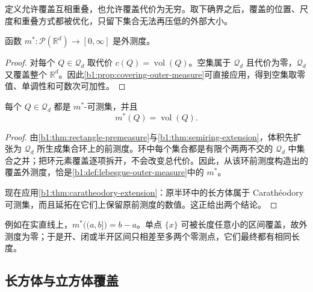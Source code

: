 定义允许覆盖互相重叠，也允许覆盖代价为无穷。取下确界之后，覆盖的位置、尺度和重叠方式都被优化，只留下集合无法再压低的外部大小。

\begin{proposition}
\label{b1:prop:lebesgue-outer-measure}
函数 \(m^*:\mathcal P(\mathbb R^d)\to[0,\infty]\) 是外测度。
\end{proposition}
\begin{proof}
对每个 \(Q\in\mathscr Q_d\) 取代价 \(c(Q)=\operatorname{vol}(Q)\)。空集属于 \(\mathscr Q_d\) 且代价为零，\(\mathscr Q_d\) 又覆盖整个 \(\mathbb R^d\)。因此\cref{b1:prop:covering-outer-measure}可直接应用，得到空集取零值、单调性和可数次可加性。
\end{proof}

\begin{proposition}
\label{b1:prop:rectangle-outer-measure}
每个 \(Q\in\mathscr Q_d\) 都是 \(m^*\)-可测集，并且
\[
m^*(Q)=\operatorname{vol}(Q).
\]
\end{proposition}
\begin{proof}
由\cref{b1:thm:rectangle-premeasure}与\cref{b1:thm:semiring-extension}，体积先扩张为 \(\mathscr Q_d\) 所生成集合环上的前测度。环中每个集合都是有限个两两不交的 \(\mathscr Q_d\) 中集合之并；把环元素覆盖逐项拆开，不会改变总代价。因此，从该环前测度构造出的覆盖外测度，恰是\cref{b1:def:lebesgue-outer-measure}中的 \(m^*\)。

现在应用\cref{b1:thm:caratheodory-extension}：原半环中的长方体属于 Carathéodory 可测集，而且延拓在它们上保留原前测度的数值。这正给出两个结论。
\end{proof}

例如在实直线上，\(m^*\bigl((a,b]\bigr)=b-a\)。单点 \(\{x\}\) 可被长度任意小的区间覆盖，故外测度为零；于是开、闭或半开区间只相差至多两个零测点，它们最终都有相同长度。

\subsection{长方体与立方体覆盖}
\label{b1:subsec:030103}

